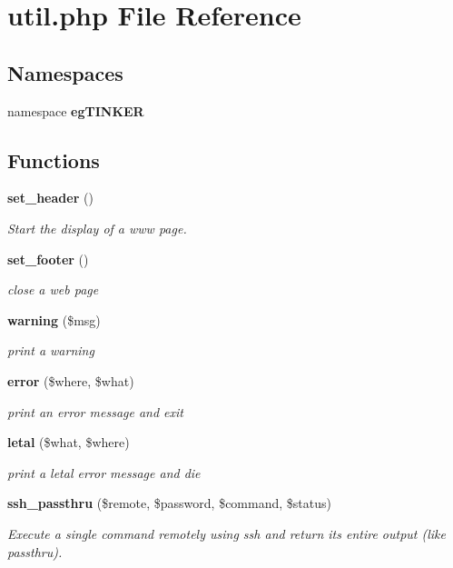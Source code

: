 \section{util.php File Reference}
\label{util_8php}
\subsection*{Namespaces}
\begin{CompactItemize}
\item 
namespace {\bf eg\-TINKER}
\end{CompactItemize}
\subsection*{Functions}
\begin{CompactItemize}
\item 
{\bf set\_\-header} ()
\begin{CompactList}\small\item\em Start the display of a www page. \item\end{CompactList}\item 
{\bf set\_\-footer} ()
\begin{CompactList}\small\item\em close a web page \item\end{CompactList}\item 
{\bf warning} (\$msg)
\begin{CompactList}\small\item\em print a warning \item\end{CompactList}\item 
{\bf error} (\$where, \$what)
\begin{CompactList}\small\item\em print an error message and exit \item\end{CompactList}\item 
{\bf letal} (\$what, \$where)
\begin{CompactList}\small\item\em print a letal error message and die \item\end{CompactList}\item 
{\bf ssh\_\-passthru} (\$remote, \$password, \$command, \$status)
\begin{CompactList}\small\item\em Execute a single command remotely using ssh and return its entire output (like passthru). \item\end{CompactList}\item 

\end{CompactItemize}

